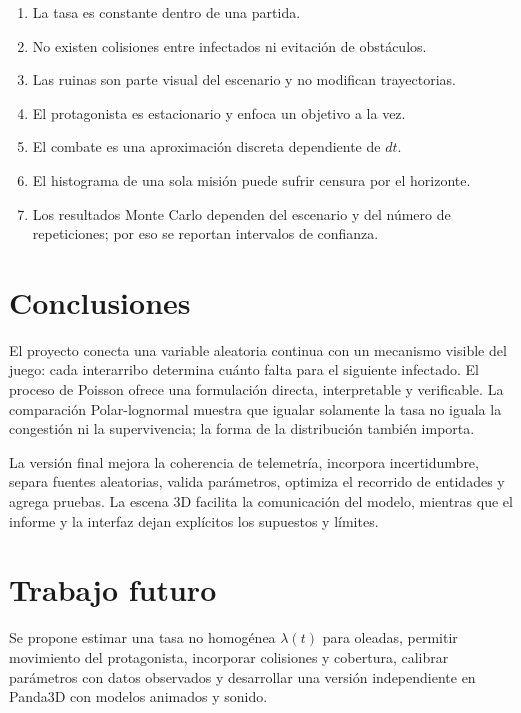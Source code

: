 \documentclass[12pt,a4paper]{article}
\begin{document}
\begin{enumerate}
  \item La tasa es constante dentro de una partida.
  \item No existen colisiones entre infectados ni evitaci\'on de obst\'aculos.
  \item Las ruinas son parte visual del escenario y no modifican trayectorias.
  \item El protagonista es estacionario y enfoca un objetivo a la vez.
  \item El combate es una aproximaci\'on discreta dependiente de $dt$.
  \item El histograma de una sola misi\'on puede sufrir censura por el horizonte.
  \item Los resultados Monte Carlo dependen del escenario y del n\'umero de
        repeticiones; por eso se reportan intervalos de confianza.
\end{enumerate}

\section{Conclusiones}

El proyecto conecta una variable aleatoria continua con un mecanismo visible del
juego: cada interarribo determina cu\'anto falta para el siguiente infectado. El
proceso de Poisson ofrece una formulaci\'on directa, interpretable y verificable.
La comparaci\'on Polar-lognormal muestra que igualar solamente la tasa no iguala
la congesti\'on ni la supervivencia; la forma de la distribuci\'on tambi\'en importa.

La versi\'on final mejora la coherencia de telemetr\'ia, incorpora incertidumbre,
separa fuentes aleatorias, valida par\'ametros, optimiza el recorrido de entidades
y agrega pruebas. La escena 3D facilita la comunicaci\'on del modelo, mientras que
el informe y la interfaz dejan expl\'icitos los supuestos y l\'imites.

\section{Trabajo futuro}

Se propone estimar una tasa no homog\'enea $\lambda(t)$ para oleadas, permitir
movimiento del protagonista, incorporar colisiones y cobertura, calibrar
par\'ametros con datos observados y desarrollar una versi\'on independiente en
Panda3D con modelos animados y sonido.
\end{document}
